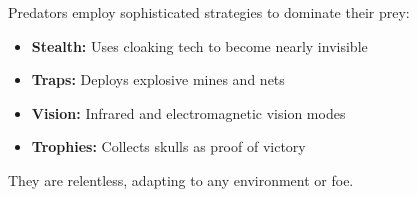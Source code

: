 \documentclass[a4paper,portrait]{article} %
\begin{document}
\begin{minipage}[t]{0.45\textwidth}
\end{minipage}%
\hfill
\begin{minipage}[t]{0.5\textwidth}
    \begin{tcolorbox}[
        colback=green!30,
        colframe=boxframe,
        width=\textwidth,
        boxrule=1.5pt,
        arc=8pt,
        title={Hunting Tactics},
        fonttitle=\Large\bfseries,
        coltitle=blueaccent, %
        colbacktitle=green!20,
    ]
        \large\color{textcolor} %
        Predators employ sophisticated strategies to dominate their prey:

        \begin{itemize}
            \item \textbf{Stealth:} Uses cloaking tech to become nearly invisible
            \item \textbf{Traps:} Deploys explosive mines and nets
            \item \textbf{Vision:} Infrared and electromagnetic vision modes
            \item \textbf{Trophies:} Collects skulls as proof of victory
        \end{itemize}
        They are relentless, adapting to any environment or foe.
    \end{tcolorbox}
\end{minipage}
\end{document}
